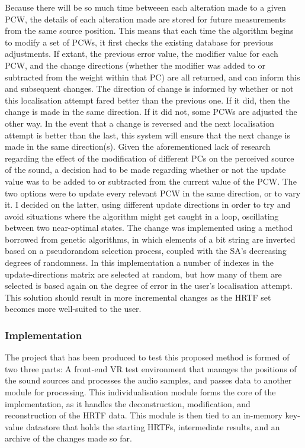 Because there will be so much time betweeen each alteration made to a given PCW, the details of each alteration made are stored for future measurements from the same source position. This means that each time the algorithm begins to modify a set of PCWs, it first checks the existing database for previous adjustments. If extant, the previous error value, the modifier value for each PCW, and the change directions (whether the modifier was added to or subtracted from the weight within that PC) are all returned, and can inform this and subsequent changes. The direction of change is informed by whether or not this localisation attempt fared better than the previous one. If it did, then the change is made in the same direction. If it did not, some PCWs are adjusted the other way. In the event that a change is reversed and the next localisation attempt is better than the last, this system will ensure that the next change is made in the same direction(s). Given the aforementioned lack of research regarding the effect of the modification of different PCs on the perceived source of the sound, a decision had to be made regarding whether or not the update value was to be added to or subtracted from the current value of the PCW. The two options were to update every relevant PCW in the same direction, or to vary it. I decided on the latter, using different update directions in order to try and avoid situations where the algorithm might get caught in a loop, oscillating between two near-optimal states. The change was implemented using a method borrowed from genetic algorithms, in which elements of a bit string are inverted based on a pseudorandom selection process, coupled with the SA's decreasing degrees of randomness. In this implementation a number of indexes in the update-directions matrix are selected at random, but how many of them are selected is based again on the degree of error in the user's localisation attempt. This solution should result in more incremental changes as the HRTF set becomes more well-suited to the user. 


\subsubsection{Implementation}
The project that has been produced to test this proposed method is formed of two three parts: A front-end VR test environment that manages the positions of the sound sources and processes the audio samples, and passes data to another module for processing. This individualisation module forms the core of the implementation, as it handles the deconstruction, modification, and reconstruction of the HRTF data. This module is then tied to an in-memory key-value datastore that holds the starting HRTFs, intermediate results, and an archive of the changes made so far. 

